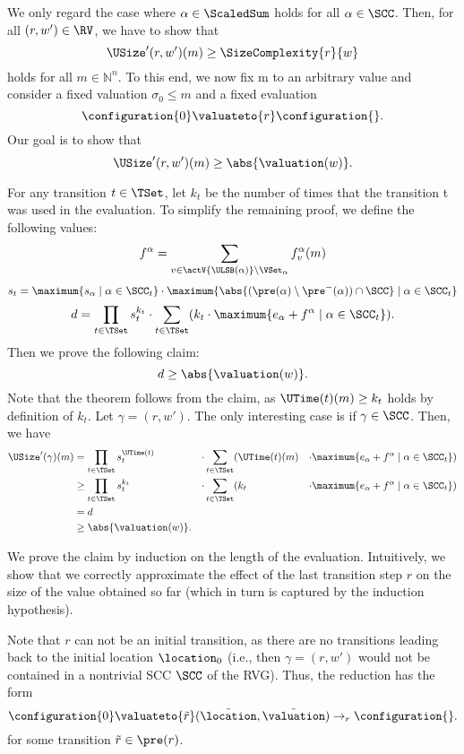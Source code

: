 We only regard the case where $\alpha \in \ScaledSum$ holds for all $\alpha \in \SCC$.
Then, for all $(r, w') \in \RV$, we have to show that
\[ \USize'(r, w')(m) \geq \SizeComplexity{r}{w} \]
holds for all $m \in \mathbb{N}^n$.
To this end, we now fix m to an arbitrary value and consider a fixed valuation $\sigma_0 \leq m$ and a fixed evaluation
\[ \configuration{0} \valuateto{r} \configuration{}. \]
Our goal is to show that
\[ \USize'(r, w')(m) \geq \abs{\valuation(w)}. \]

For any transition $t \in \TSet$, let $k_t$ be the number of times that the transition t was used in the evaluation.
To simplify the remaining proof, we define the following values:
\[ f^\alpha = \sum_{v \in \actV{\ULSB(\alpha)} \setminus \VSet_\alpha} f^\alpha_v(m) \]
\[ s_t = \maximum{s_{\alpha} \mid \alpha \in \SCC_t} \cdot \maximum{\abs{(\pre(\alpha) \setminus \pre^-(\alpha)) \cap \SCC} \mid \alpha \in \SCC_t} \]
\[ d = \prod_{t \in \TSet} s^{k_t}_t \cdot \sum_{t \in \TSet} (k_t \cdot \maximum{e_\alpha + f^\alpha \mid \alpha \in \SCC_t}). \]
Then we prove the following claim:
\[ d \geq \abs{\valuation(w)}. \]
Note that the theorem follows from the claim, as $\UTime(t)(m) \geq k_t$ holds by definition of $k_t$.
Let $\gamma = (r, w')$.
The only interesting case is if $\gamma \in \SCC$.
Then, we have
\begin{align*}
  \USize'(\gamma)(m) &= \prod_{t \in \TSet} s_t^{\UTime(t)} & \cdot \sum_{t \in \TSet} (& \UTime(t)(m) & \cdot \maximum{ e_\alpha + f^\alpha \mid \alpha \in \SCC_t }) \\
  & \geq \prod_{t \in \TSet} s_t^{k_t} & \cdot \sum_{t \in \TSet} (& k_t & \cdot \maximum{ e_\alpha + f^\alpha \mid \alpha \in \SCC_t }) \\
  &= d \\
  & \geq \abs{\valuation(w)}.
\end{align*}

We prove the claim by induction on the length of the evaluation.
Intuitively, we show that we correctly approximate the effect of the last transition step $r$ on the size of the value obtained so far (which in turn is captured by the induction hypothesis).

Note that $r$ can not be an initial transition, as there are no transitions leading back to the initial location $\location_0$
(i.e., then $\gamma = (r, w')$ would not be contained in a nontrivial SCC $\SCC$ of the RVG).
Thus, the reduction has the form
\[ \configuration{0} \valuateto{\tilde{r}} (\tilde{\location}, \tilde{\valuation}) \rightarrow_r \configuration{}. \]
for some transition $\tilde{r} \in \pre(r)$.

